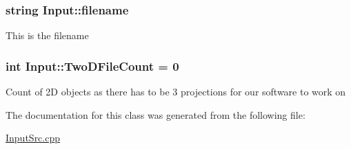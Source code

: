 \subsubsection[{\texorpdfstring{filename}{filename}}]{\setlength{\rightskip}{0pt plus 5cm}string Input\+::filename}\hypertarget{classInput_af296359065236ac9139aab7736d6844d}{}\label{classInput_af296359065236ac9139aab7736d6844d}
This is the filename 
\subsubsection[{\texorpdfstring{Two\+D\+File\+Count}{TwoDFileCount}}]{\setlength{\rightskip}{0pt plus 5cm}int Input\+::\+Two\+D\+File\+Count = 0}\hypertarget{classInput_a82141fe9142aec447f9ef52fd2f78c73}{}\label{classInput_a82141fe9142aec447f9ef52fd2f78c73}
Count of 2D objects as there has to be 3 projections for our software to work on 

The documentation for this class was generated from the following file\+:\begin{DoxyCompactItemize}
\item 
\hyperlink{InputSrc_8cpp}{Input\+Src.\+cpp}\end{DoxyCompactItemize}
